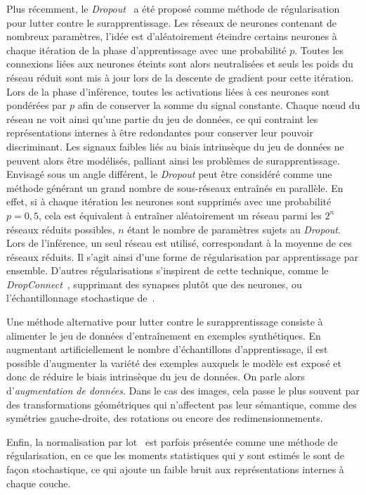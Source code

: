 Plus récemment, le \emph{Dropout}~\cite{srivastava_dropout_2014} a été proposé comme méthode de régularisation pour lutter contre le surapprentissage. Les réseaux de neurones contenant de nombreux paramètres, l'idée est d'aléatoirement éteindre certains neurones à chaque itération de la phase d'apprentissage avec une probabilité $p$. Toutes les connexions liées aux neurones éteints sont alors neutralisées et seuls les poids du réseau réduit sont mis à jour lors de la descente de gradient pour cette itération. Lors de la phase d'inférence, toutes les activations liées à ces neurones sont pondérées par $p$ afin de conserver la somme du signal constante. Chaque n\oe{}ud du réseau ne voit ainsi qu'une partie du jeu de données, ce qui contraint les représentations internes à être redondantes pour conserver leur pouvoir discriminant. Les signaux faibles liés au biais intrinsèque du jeu de données ne peuvent alors être modélisés, palliant ainsi les problèmes de surapprentissage. Envisagé sous un angle différent, le \emph{Dropout} peut être considéré comme une méthode générant un grand nombre de sous-réseaux entraînés en parallèle. En effet, si à chaque itération les neurones sont supprimés avec une probabilité $p = 0,5$, cela est équivalent à entraîner aléatoirement un réseau parmi les $2^n$ réseaux réduits possibles, $n$ étant le nombre de paramètres sujets au \emph{Dropout}. Lors de l'inférence, un seul réseau est utilisé, correspondant à la moyenne de ces réseaux réduits. Il s'agit ainsi d'une forme de régularisation par apprentissage par ensemble. D'autres régularisations s'inspirent de cette technique, comme le \emph{DropConnect}~\cite{wan_regularization_2013}, supprimant des synapses plutôt que des neurones, ou l'échantillonnage stochastique de~\citet{zeiler_stochastic_2013}.

Une méthode alternative pour lutter contre le surapprentissage consiste à alimenter le jeu de données d'entraînement en exemples synthétiques. En augmentant artificiellement le nombre d'échantillons d'apprentissage, il est possible d'augmenter la variété des exemples auxquels le modèle est exposé et donc de réduire le biais intrinsèque du jeu de données. On parle alors d'\emph{augmentation de données}. Dans le cas des images, cela passe le plus souvent par des transformations géométriques qui n'affectent pas leur sémantique, comme des symétries gauche-droite, des rotations ou encore des redimensionnements.

Enfin, la normalisation par lot~\cite{ioffe_batch_2015} est parfois présentée comme une méthode de régularisation, en ce que les moments statistiques qui y sont estimés le sont de façon stochastique, ce qui ajoute un faible bruit aux représentations internes à chaque couche.

